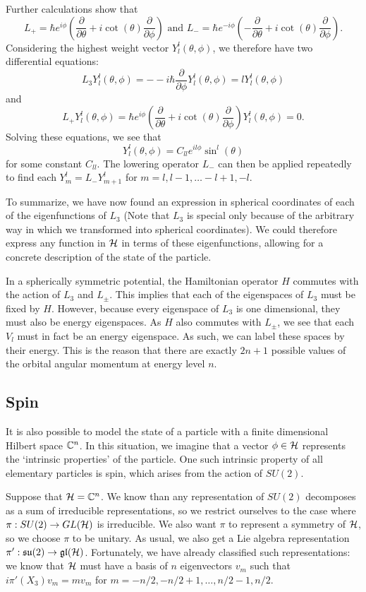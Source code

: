 \documentclass[a4paper]{article}
\begin{document}
Further calculations show that 
$$L_{+} = \hbar e^{i\phi} \left(\frac{\partial}{\partial \theta} + i\cot(\theta)\frac{\partial}{\partial \phi}\right) \text{  and  } L_{-} = \hbar e^{-i\phi} \left(-\frac{\partial}{\partial \theta} + i\cot(\theta)\frac{\partial}{\partial \phi}\right).$$
Considering the highest weight vector $Y^l_{l}(\theta, \phi)$, we therefore have two differential equations: $$L_3 Y^l_{l}(\theta, \phi) = - -i\hbar \frac{\partial}{\partial \phi} Y^l_{l}(\theta, \phi) = l Y^l_{l}(\theta, \phi)$$ 
and 
$$L_{+} Y^l_{l}(\theta, \phi) = \hbar e^{i\phi} \left(\frac{\partial}{\partial \theta} + i\cot(\theta)\frac{\partial}{\partial \phi}\right)Y^l_{l}(\theta, \phi) = 0.$$
Solving these equations, we see that 
$$Y^l_{l}(\theta, \phi) = C_{ll} e^{il\phi}\sin^{l}(\theta)$$
for some constant $C_{ll}$. The lowering operator $L_{-}$ can then be applied repeatedly to find each $Y^l_{m} = L_{-}Y^l_{m+1}$ for $m = l, l -1, \hdots -l + 1, -l$.

To summarize, we have now found an expression in spherical coordinates of each of the eigenfunctions of $L_3$ (Note that $L_3$ is special only because of the arbitrary way in which we transformed into spherical coordinates). We could therefore express any function in $\mathcal{H}$ in terms of these eigenfunctions, allowing for a concrete description of the state of the particle.

In a spherically symmetric potential, the Hamiltonian operator $H$ commutes with the action of $L_3$ and $L_{\pm}$. This implies that each of the eigenspaces of $L_3$ must be fixed by $H$. However, because every eigenspace of $L_3$ is one dimensional, they must also be energy eigenspaces. As $H$ also commutes with $L_{\pm}$, we see that each $V_l$ must in fact be an energy eigenspace. As such, we can label these spaces by their energy. This is the reason that there are exactly $2n+ 1$ possible values of the orbital angular momentum at energy level $n$.

\subsection{Spin}
It is also possible to model the state of a particle with a finite dimensional Hilbert space $\mathbb{C}^n$. In this situation, we imagine that a vector $\phi \in \mathcal{H}$ represents the `intrinsic properties' of the particle. One such intrinsic property of all elementary particles is spin, which arises from the action of $SU(2)$. 

Suppose that $\mathcal{H} = \mathbb{C}^n$. We know than any representation of $SU(2)$ decomposes as a sum of irreducible representations, so we restrict ourselves to the case where $\pi : SU(2) \to GL(\mathcal{H})$ is irreducible. We also want $\pi$ to represent a symmetry of $\mathcal{H}$, so we choose $\pi$ to be unitary. As usual, we also get a Lie algebra representation $\pi' : \mathfrak{su}(2) \to \mathfrak{gl}(\mathcal{H})$. Fortunately, we have already classified such representations: we know that $\mathcal{H}$ must have a basis of $n$ eigenvectors $v_m$ such that $i\pi'(X_3)v_m = m v_m$ for $m = -n/2, -n/2 + 1, \hdots, n/2 - 1,  n/2$. 
\end{document}
